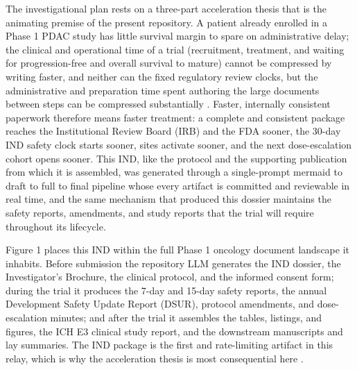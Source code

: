The investigational plan rests on a three-part acceleration thesis that is the
animating premise of the present repository. A patient already enrolled in a Phase
1 PDAC study has little survival margin to spare on administrative delay; the
clinical and operational time of a trial (recruitment, treatment, and waiting for
progression-free and overall survival to mature) cannot be compressed by writing
faster, and neither can the fixed regulatory review clocks, but the administrative
and preparation time spent authoring the large documents between steps can be
compressed substantially \cite{oncotrialllm, paipredict4x}. Faster, internally
consistent paperwork therefore means faster treatment: a complete and consistent
package reaches the Institutional Review Board (IRB) and the FDA sooner, the 30-day
IND safety clock starts sooner, sites activate sooner, and the next dose-escalation
cohort opens sooner. This IND, like the protocol and the supporting publication
from which it is assembled, was generated through a single-prompt mermaid to draft
to full to final pipeline whose every artifact is committed and reviewable in real
time, and the same mechanism that produced this dossier maintains the safety
reports, amendments, and study reports that the trial will require throughout its
lifecycle.

Figure 1 places this IND within the full Phase 1 oncology document landscape it
inhabits. Before submission the repository LLM generates the IND dossier, the
Investigator's Brochure, the clinical protocol, and the informed consent form;
during the trial it produces the 7-day and 15-day safety reports, the annual
Development Safety Update Report (DSUR), protocol amendments, and dose-escalation
minutes; and after the trial it assembles the tables, listings, and figures, the
ICH E3 clinical study report, and the downstream manuscripts and lay summaries. The
IND package is the first and rate-limiting artifact in this relay, which is why the
acceleration thesis is most consequential here \cite{oncotrialllm}.

